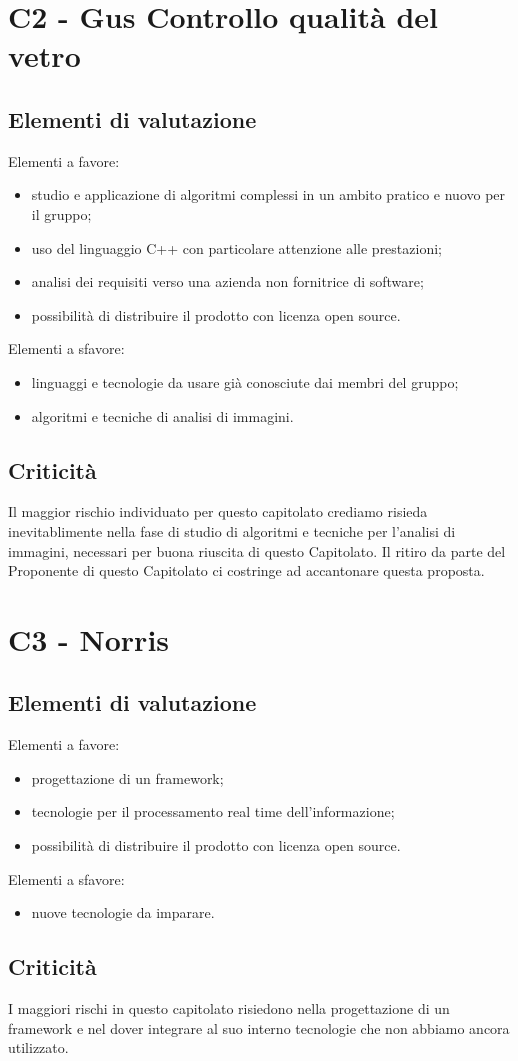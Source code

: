 \section{C2 - Gus Controllo qualità del vetro}{
	\subsection{Elementi di valutazione}{
		Elementi a favore:
		\begin{itemize}
			\item studio e applicazione di algoritmi complessi in un ambito pratico e nuovo per il gruppo;
			\item uso del linguaggio C++ con particolare attenzione alle prestazioni;
			\item analisi dei requisiti verso una azienda non fornitrice di software;
			\item possibilità di distribuire il prodotto con licenza open source.
		\end{itemize}
		
		Elementi a sfavore:
		\begin{itemize}
			\item linguaggi e tecnologie da usare già conosciute dai membri del gruppo;
			\item algoritmi e tecniche di analisi di immagini.
		\end{itemize}
	}
	\subsection{Criticità}{
		Il maggior rischio individuato per questo capitolato crediamo risieda inevitablimente nella fase di studio di algoritmi e tecniche per l'analisi di immagini, necessari per buona riuscita di questo Capitolato.
		Il ritiro da parte del Proponente di questo Capitolato ci costringe ad accantonare questa proposta.
	}
}
\section{C3 - Norris}{
	\subsection{Elementi di valutazione}{
		Elementi a favore:
		\begin{itemize}
			\item progettazione di un framework;
			\item tecnologie per il processamento real time dell'informazione;
			\item possibilità di distribuire il prodotto con licenza open source.
		\end{itemize}
		
		Elementi a sfavore:
		\begin{itemize}
			\item nuove tecnologie da imparare.
		\end{itemize}
	}
	\subsection{Criticità}{
		I maggiori rischi in questo capitolato risiedono nella progettazione di un framework e nel dover integrare al suo interno tecnologie che non abbiamo ancora utilizzato.
	}
}
